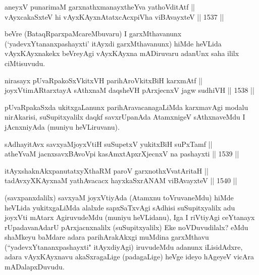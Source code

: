 

\begin{shl}
aneyxV punarimaM garxnathxmanayxtheYva yathoVditAtf ||  \\
vAyxcakaSxteV hi vAyxKAyxnAtatxcAcxpiVha viBAvayxteV ||  1537 ||  
\end{shl}

\begin{artha}
beVre (BataqRparxpaMcareMbuvaru) I garxMthavanunx (`yadevxYtananxpashayxti' itAyxdi garxMthavanunx) hiMde heVLida vAyxKAyxnakekx beVreyAgi vAyxKAyxna mADiruvaru adanUnx saha ililx ciMtisuvudu.
\end{artha}


\begin{shl}
nirasayx pUvaRpakoSxVkitxVH parihAroVkitxBiH karxmAtf || \\
joyxVtimARtarxtayA sAthxnaM daqsheVH pArxjecnxV jagw sudhiVH ||  1538 ||  
\end{shl}

\begin{artha}
pUvaRpakaSxda ukitxgaLanunx parihAravacanagaLiMda karxmavAgi modalu nirAkarisi, suSupitxyalilx daqkf savxrUpanAda AtamxnigeV sAthxnaveMdu I jAcnxniyAda (muniyu heVLiruvanu).
\end{artha}


\begin{shl}
sAdhayitAvx savxyaMjoyxVtiH suSupetxV yukitxBiH suPxTamf || \\
atheYvaM jacnxsavxBAvoV\s pi kasAmxtApxrXjecnxV na pashayxti ||  1539 ||  
\end{shl}
				
\begin{shl}
itAyxshaknAkxpanutatxyXthaRM paroV garxnothxV\s vatAritaH || \\
tadAvxyXKAyxnaM yathAvacacx hayxkaSxrANAM viBAvayxteV ||  1540 ||  
\end{shl}


\begin{artha}
(savxpanxdalilx) savxyaM joyxVtiyAda (Atamxnu toVruvaneMdu) hiMde heVLida yukitxgaLiMda alalxde sapxSaTxvAgi sAdhisi suSupitxyalilx adu joyxVti mAtarx AgiruvudeMdu (muniyu heVLidanu), Iga I riVtiyAgi ceYtanayx rUpadavanAdarU pArxjacnxnalilx (suSupitxyalilx) Eke noVDuvudilalx? eMdu shaMkeyu baMdare adara parihArakAkxgi muMdina garxMthavu (``yadevxYtananxpashayxti" itAyxdiyAgi) iruvudeMdu adanunx iLisidAdxre, adara vAyxKAyxnavu akaSxragaLige (padagaLige) heVge ideyo hAgeyeV vicAra mADalapxDuvudu.
\end{artha}

